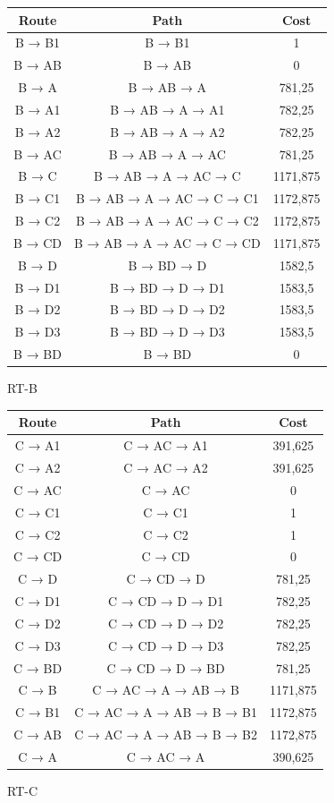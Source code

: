\documentclass[a4paper, titlepage,12pt]{article}
\begin{document}
		\begin{figure}
			\begin{tabular}{|c|c|c|}

				\hline
Route & Path & Cost \\
\hline
B → B1 & B → B1 & 1 \\
\hline
B → AB & B → AB & 0 \\
\hline
B → A & B → AB → A & 781,25 \\
\hline
B → A1 & B → AB → A → A1 & 782,25 \\
\hline
B → A2 & B → AB → A → A2 & 782,25 \\
\hline
B → AC & B → AB → A → AC & 781,25 \\
\hline
B → C & B → AB → A → AC → C & 1171,875 \\
\hline
B → C1 & B → AB → A → AC → C → C1 & 1172,875 \\
\hline
B → C2 & B → AB → A → AC → C → C2 & 1172,875 \\
\hline
B → CD & B → AB → A → AC → C → CD & 1171,875 \\
\hline
B → D & B → BD → D & 1582,5 \\
\hline
B → D1 & B → BD → D → D1 & 1583,5 \\
\hline
B → D2 & B → BD → D → D2 & 1583,5 \\
\hline
B → D3 & B → BD → D → D3 & 1583,5 \\
\hline
B → BD & B → BD & 0 \\
\hline

			\end{tabular}
			\caption{RT-B}
		\end{figure}

		\begin{figure}
			\begin{tabular}{|c|c|c|}


				\hline
Route & Path & Cost \\
\hline
C → A1 & C → AC → A1 & 391,625 \\
\hline
C → A2 & C → AC → A2 & 391,625 \\
\hline
C → AC & C → AC & 0 \\
\hline
C → C1 & C → C1 & 1 \\
\hline
C → C2 & C → C2 & 1 \\
\hline
C → CD & C → CD & 0 \\
\hline
C → D & C → CD → D & 781,25 \\
\hline
C → D1 & C → CD → D → D1 & 782,25 \\
\hline
C → D2 & C → CD → D → D2 & 782,25 \\
\hline
C → D3 & C → CD → D → D3 & 782,25 \\
\hline
C → BD & C → CD → D → BD & 781,25 \\
\hline
C → B & C → AC → A → AB → B & 1171,875 \\
\hline
C → B1 & C → AC → A → AB → B → B1 & 1172,875 \\
\hline
C → AB & C → AC → A → AB → B → B2 & 1172,875 \\
\hline
C → A & C → AC → A & 390,625 \\
\hline
			\end{tabular}
			\caption{RT-C}
		\end{figure}
\end{document}
